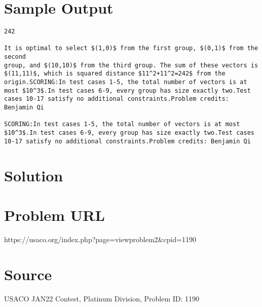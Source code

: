 \documentclass[12pt]{article}
\begin{document}
\section*{Sample Output}
\begin{verbatim}
242

It is optimal to select $(1,0)$ from the first group, $(0,1)$ from the second
group, and $(10,10)$ from the third group. The sum of these vectors is
$(11,11)$, which is squared distance $11^2+11^2=242$ from the origin.SCORING:In test cases 1-5, the total number of vectors is at most $10^3$.In test cases 6-9, every group has size exactly two.Test cases 10-17 satisfy no additional constraints.Problem credits: Benjamin Qi

SCORING:In test cases 1-5, the total number of vectors is at most $10^3$.In test cases 6-9, every group has size exactly two.Test cases 10-17 satisfy no additional constraints.Problem credits: Benjamin Qi
\end{verbatim}

\section*{Solution}


\section*{Problem URL}
https://usaco.org/index.php?page=viewproblem2&cpid=1190

\section*{Source}
USACO JAN22 Contest, Platinum Division, Problem ID: 1190
\end{document}
